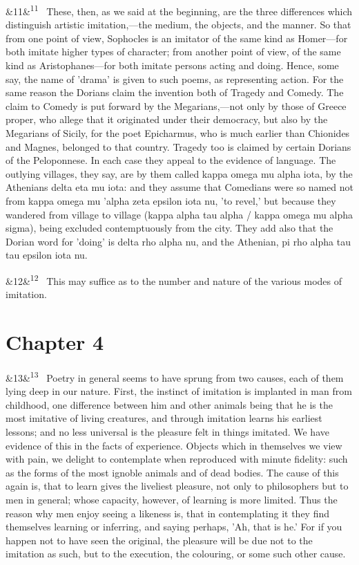 \documentclass[12pt]{article}
\newcommand{\para}[1][]{\par\noindent\ifx&#1&\else\textsuperscript{\footnotesize #1}~\fi}
\begin{document}
\para[11] These, then, as we said at the beginning, are the three differences which distinguish artistic imitation,---the medium, the objects, and the manner. So that from one point of view, Sophocles is an imitator of the same kind as Homer---for both imitate higher types of character; from another point of view, of the same kind as Aristophanes---for both imitate persons acting and doing. Hence, some say, the name of 'drama' is given to such poems, as representing action. For the same reason the Dorians claim the invention both of Tragedy and Comedy. The claim to Comedy is put forward by the Megarians,---not only by those of Greece proper, who allege that it originated under their democracy, but also by the Megarians of Sicily, for the poet Epicharmus, who is much earlier than Chionides and Magnes, belonged to that country. Tragedy too is claimed by certain Dorians of the Peloponnese. In each case they appeal to the evidence of language. The outlying villages, they say, are by them called {kappa omega mu alpha iota}, by the Athenians {delta eta mu iota}: and they assume that Comedians were so named not from {kappa omega mu 'alpha zeta epsilon iota nu}, 'to revel,' but because they wandered from village to village (kappa alpha tau alpha / kappa omega mu alpha sigma), being excluded contemptuously from the city. They add also that the Dorian word for 'doing' is {delta rho alpha nu}, and the Athenian, {pi rho alpha tau tau epsilon iota nu}.

\para[12] This may suffice as to the number and nature of the various modes of imitation.

\section*{Chapter 4}

\para[13] Poetry in general seems to have sprung from two causes, each of them lying deep in our nature. First, the instinct of imitation is implanted in man from childhood, one difference between him and other animals being that he is the most imitative of living creatures, and through imitation learns his earliest lessons; and no less universal is the pleasure felt in things imitated. We have evidence of this in the facts of experience. Objects which in themselves we view with pain, we delight to contemplate when reproduced with minute fidelity: such as the forms of the most ignoble animals and of dead bodies. The cause of this again is, that to learn gives the liveliest pleasure, not only to philosophers but to men in general; whose capacity, however, of learning is more limited. Thus the reason why men enjoy seeing a likeness is, that in contemplating it they find themselves learning or inferring, and saying perhaps, 'Ah, that is he.' For if you happen not to have seen the original, the pleasure will be due not to the imitation as such, but to the execution, the colouring, or some such other cause.
\end{document}
